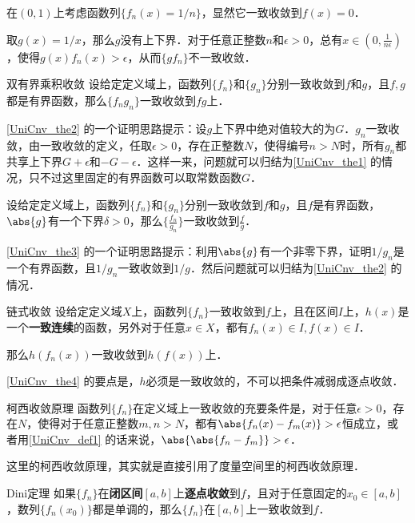 \begin{example}{}\label{UniCnv_ex3}
在$(0, 1)$上考虑函数列$\{f_n(x)=1/n\}$，显然它一致收敛到$f(x)=0$．

取$g(x)=1/x$，那么$g$没有上下界．对于任意正整数$n$和$\epsilon>0$，总有$x\in(0, \frac{1}{n\epsilon})$，使得$g(x)f_n(x)>\epsilon$，从而$\{gf_n\}$不一致收敛．
\end{example}

\begin{theorem}{双有界乘积收敛}\label{UniCnv_the2}
设给定定义域上，函数列$\{f_n\}$和$\{g_n\}$分别一致收敛到$f$和$g$，且$f, g$都是有界函数，那么$\{f_ng_n\}$一致收敛到$fg$上．
\end{theorem}

\autoref{UniCnv_the2} 的一个证明思路提示：设$g$上下界中绝对值较大的为$G$．$g_n$一致收敛，由一致收敛的定义，任取$\epsilon>0$，存在正整数$N$，使得编号$n>N$时，所有$g_n$都共享上下界$G+\epsilon$和$-G-\epsilon$．这样一来，问题就可以归结为\autoref{UniCnv_the1} 的情况，只不过这里固定的有界函数可以取常数函数$G$．

\begin{theorem}{}\label{UniCnv_the3}
设给定定义域上，函数列$\{f_n\}$和$\{g_n\}$分别一致收敛到$f$和$g$，且$f$是有界函数，$\abs{g}$有一个下界$\delta>0$，那么$\{\frac{f_n}{g_n}\}$一致收敛到$\frac{f}{g}$．
\end{theorem}

\autoref{UniCnv_the3} 的一个证明思路提示：利用$\abs{g}$有一个非零下界，证明$1/g_n$是一个有界函数，且$1/g_n$一致收敛到$1/g$．然后问题就可以归结为\autoref{UniCnv_the2} 的情况．

\begin{theorem}{链式收敛}\label{UniCnv_the4}
设给定定义域$X$上，函数列$\{f_n\}$一致收敛到$f$上，且在区间$I$上，$h(x)$是一个\textbf{一致连续}的函数，另外对于任意$x\in X$，都有$f_n(x)\in I, f(x)\in I$．

那么$h(f_n(x))$一致收敛到$h(f(x))$上．
\end{theorem}

\autoref{UniCnv_the4} 的要点是，$h$必须是一致收敛的，不可以把条件减弱成逐点收敛．

\begin{theorem}{柯西收敛原理}
函数列$\{f_n\}$在定义域上一致收敛的充要条件是，对于任意$\epsilon>0$，存在$N$，使得对于任意正整数$m, n>N$，都有$\abs{f_n(x)-f_m(x)}>\epsilon$恒成立，或者用\autoref{UniCnv_def1} 的话来说，$\abs{\abs{f_n-f_m}}>\epsilon$．
\end{theorem}

这里的柯西收敛原理，其实就是直接引用了度量空间里的柯西收敛原理．

\begin{theorem}{Dini定理}
如果$\{f_n\}$在\textbf{闭区间}$[a, b]$上\textbf{逐点收敛}到$f$，且对于任意固定的$x_0\in [a, b]$，数列$\{f_n(x_0)\}$都是单调的，那么$\{f_n\}$在$[a, b]$上一致收敛到$f$．
\end{theorem}











